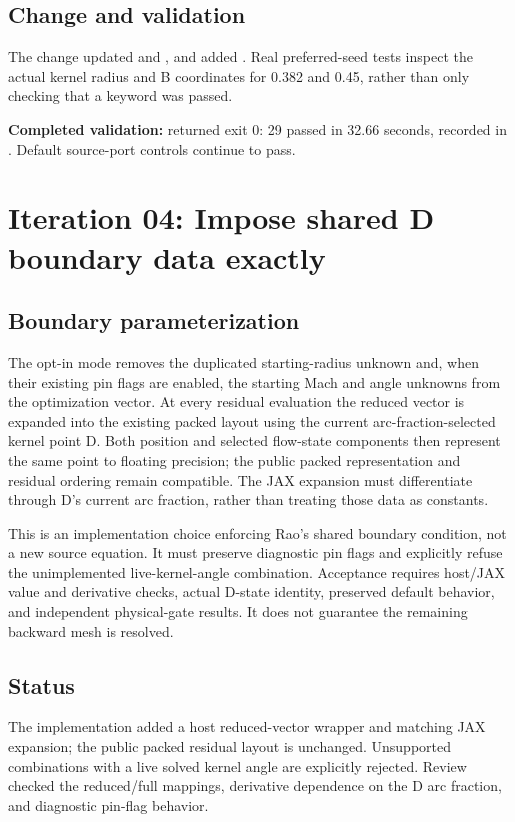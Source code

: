 \subsection{Change and validation}
The change updated  and
, and added
. Real preferred-seed tests
inspect the actual kernel radius and B coordinates for 0.382 and 0.45,
rather than only checking that a keyword was passed.

\textbf{Completed validation:}
returned exit 0: 29 passed in 32.66 seconds, recorded in
. Default source-port controls continue to pass.

\section{Iteration 04: Impose shared D boundary data exactly}
\subsection{Boundary parameterization}
The opt-in  mode removes the duplicated
starting-radius unknown and, when their existing pin flags are enabled,
the starting Mach and angle unknowns from the optimization vector. At
every residual evaluation the reduced vector is expanded into the existing
packed layout using the current arc-fraction-selected kernel point D.
Both position and selected flow-state components then represent the same
point to floating precision; the public packed representation and residual
ordering remain compatible. The JAX expansion must differentiate through
D's current arc fraction, rather than treating those data as constants.

This is an implementation choice enforcing Rao's shared boundary condition,
not a new source equation. It must preserve diagnostic pin flags and
explicitly refuse the unimplemented live-kernel-angle combination.
Acceptance requires host/JAX value and derivative checks, actual D-state
identity, preserved default behavior, and independent physical-gate results.
It does not guarantee the remaining backward mesh is resolved.

\subsection{Status}
The implementation added a host reduced-vector wrapper and matching JAX expansion;
the public packed residual layout is unchanged. Unsupported combinations
with a live solved kernel angle are explicitly rejected. Review checked the
reduced/full mappings, derivative dependence on the D arc fraction, and
diagnostic pin-flag behavior.

